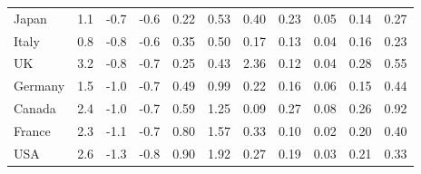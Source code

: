 \begin{tabular}[t]{lcccccccccc}
Japan & 1.1 & -0.7 & -0.6 & 0.22 & 0.53 & 0.40 & 0.23 & 0.05 & 0.14 & 0.27\\
Italy & 0.8 & -0.8 & -0.6 & 0.35 & 0.50 & 0.17 & 0.13 & 0.04 & 0.16 & 0.23\\
UK & 3.2 & -0.8 & -0.7 & 0.25 & 0.43 & 2.36 & 0.12 & 0.04 & 0.28 & 0.55\\
Germany & 1.5 & -1.0 & -0.7 & 0.49 & 0.99 & 0.22 & 0.16 & 0.06 & 0.15 & 0.44\\
Canada & 2.4 & -1.0 & -0.7 & 0.59 & 1.25 & 0.09 & 0.27 & 0.08 & 0.26 & 0.92\\
France & 2.3 & -1.1 & -0.7 & 0.80 & 1.57 & 0.33 & 0.10 & 0.02 & 0.20 & 0.40\\
USA & 2.6 & -1.3 & -0.8 & 0.90 & 1.92 & 0.27 & 0.19 & 0.03 & 0.21 & 0.33\\
\bottomrule
\end{tabular}